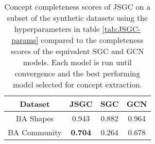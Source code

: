 \begin{table}[h]
    \centering
    \captionsetup{width=.9\textwidth}
    \begin{tabular}{c|c|cc}
        \textbf{Dataset} &
        \textbf{JSGC} &
        \textbf{SGC} &
        \textbf{GCN} \\
        \midrule
        BA Shapes       & 0.943 & 0.882 & 0.964 \\
        BA Community    & \textbf{0.704} & 0.264 & 0.678 \\
    \end{tabular}
    \caption{Concept completeness scores of JSGC on a subset of the synthetic datasets using the hyperparameters in table \ref{tab:JSGC-params} compared to the completeness scores of the equivalent SGC and GCN models. Each model is run until convergence and the best performing model selected for concept extraction.}
    \label{tab:JSGC-completeness}
\end{table}

